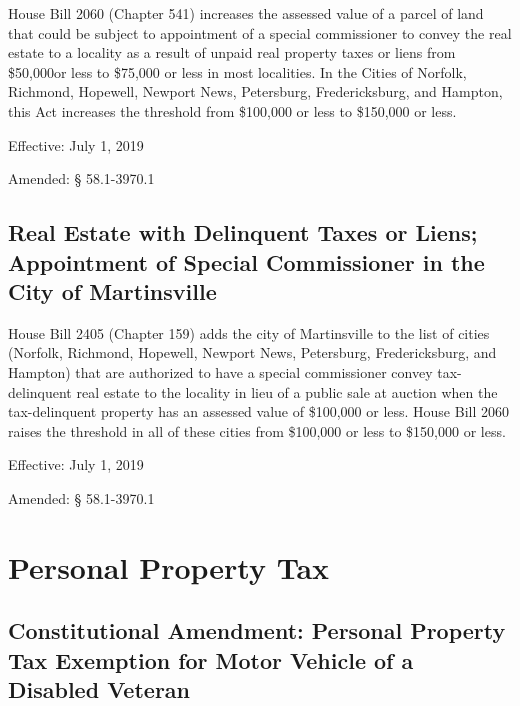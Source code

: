 \documentclass[
]{book}
\begin{document}
House Bill 2060 (Chapter 541) increases the assessed value of a parcel of land that could be subject to appointment of a special commissioner to convey the real estate to a locality as a result of unpaid real property taxes or liens from \$50,000or less to \$75,000 or less in most localities. In the Cities of Norfolk, Richmond, Hopewell, Newport News, Petersburg, Fredericksburg, and Hampton, this Act increases the threshold from \$100,000 or less to \$150,000 or less.

Effective: July 1, 2019

Amended: § 58.1-3970.1

\hypertarget{real-estate-with-delinquent-taxes-or-liens-appointment-of-special-commissioner-in-the-city-of-martinsville}{%
\subsection{Real Estate with Delinquent Taxes or Liens; Appointment of Special Commissioner in the City of Martinsville}\label{real-estate-with-delinquent-taxes-or-liens-appointment-of-special-commissioner-in-the-city-of-martinsville}}

House Bill 2405 (Chapter 159) adds the city of Martinsville to the list of cities (Norfolk, Richmond, Hopewell, Newport News, Petersburg, Fredericksburg, and Hampton) that are authorized to have a special commissioner convey tax-delinquent real estate to the locality in lieu of a public sale at auction when the tax-delinquent property has an assessed value of \$100,000 or less. House Bill 2060 raises the threshold in all of these cities from \$100,000 or less to \$150,000 or less.

Effective: July 1, 2019

Amended: § 58.1-3970.1

\hypertarget{personal-property-tax}{%
\section{Personal Property Tax}\label{personal-property-tax}}

\hypertarget{constitutional-amendment-personal-property-tax-exemption-for-motor-vehicle-of-a-disabled-veteran}{%
\subsection{Constitutional Amendment: Personal Property Tax Exemption for Motor Vehicle of a Disabled Veteran}\label{constitutional-amendment-personal-property-tax-exemption-for-motor-vehicle-of-a-disabled-veteran}}
\end{document}
